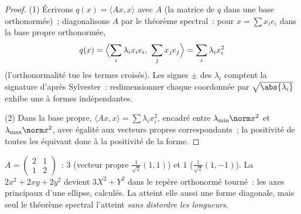 \begin{proof}
(1) Écrivons $q(x) = \langle A x, x\rangle$ avec $A$  (la
matrice de $q$ dans une base orthonormée)~; diagonalisons $A$ par le
théorème spectral~: pour $x = \sum x_ie_i$ dans la base propre
orthonormée,
\[
q(x) = \Bigl\langle \sum_i \lambda_ix_ie_i,\ \sum_j
x_je_j\Bigr\rangle = \sum_i \lambda_i x_i^2
\]
(l'orthonormalité tue les termes croisés). Les signes $\pm$ des
$\lambda_i$ comptent la signature d'après Sylvester~: redimensionner
chaque coordonnée par $\sqrt{\abs{\lambda_i}}$ exhibe une  à formes indépendantes.

(2) Dans la base propre, $\langle Ax, x\rangle = \sum \lambda_i
x_i^2$, encadré entre $\lambda_{\min}\norm x^2$ et
$\lambda_{\max}\norm x^2$, avec égalité aux vecteurs propres
correspondants~; la positivité de toutes les 
équivaut donc à la positivité de la forme.
\end{proof}

\begin{example}\label{ex:b2:quadratic:spectralexample}
$A = \begin{pmatrix} 2 & 1\\ 1 & 2 \end{pmatrix}$~: 
$3$ (vecteur propre $\frac{1}{\sqrt2}(1,1)$) et $1$
($\frac{1}{\sqrt2}(1,-1)$). La  $2x^2 + 2xy + 2y^2$
devient $3X^2 + Y^2$ dans le repère orthonormé tourné~: les axes
principaux d'une ellipse, calculés. La  atteint
elle aussi une forme diagonale, mais seul le théorème spectral
l'atteint \emph{sans distordre les longueurs}.
\end{example}

